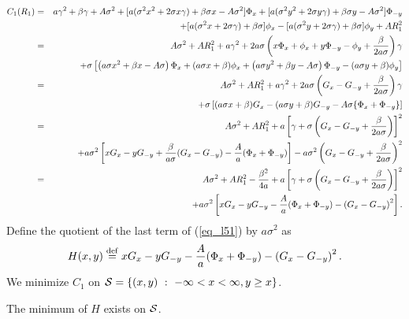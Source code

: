 \begin{eqnarray}
  C_1(R_1)
   & = & a \gamma^2 + \beta \gamma + A \sigma^2 + [a (\sigma^2 x^2 + 2 \sigma x \gamma)
         + \beta \sigma x - A\sigma^2] \Phi_x
         + [a (\sigma^2 y^2 + 2 \sigma y \gamma) + \beta \sigma y - A \sigma^2] \Phi_{-y} \nonumber \\
   &   & + [a (\sigma^2 x + 2\sigma \gamma) + \beta \sigma] \phi_x
       - [a (\sigma^2 y + 2\sigma \gamma) + \beta \sigma] \phi_y + A R_1^2  \nonumber \\
   & = & A \sigma^2 + AR_1^2 + a \gamma^2 + 2 a \sigma \left( x \Phi_x + \phi_x
         + y \Phi_{-y} - \phi_y + \frac{\beta}{2a\sigma}  \right) \gamma \nonumber \\
   &   & + \sigma \left[ \left(
         a \sigma x^2 + \beta x - A \sigma \right) \Phi_x + (a \sigma x + \beta) \phi_x +
         \left( a \sigma y^2 + \beta y -A \sigma \right) \Phi_{-y} - (a \sigma y + \beta) \phi_y
         \right] \nonumber \\
   & = & A\sigma^2 + AR_1^2 + a \gamma^2 + 2 a \sigma \left( G_x - G_{-y}
         + \frac{\beta}{2a\sigma} \right) \gamma \nonumber \\
   &   & + \sigma \left[ (a\sigma x + \beta) G_x - (a\sigma y + \beta) G_{-y}
         - A \sigma \{ \Phi_x + \Phi_{-y} \} \right] \nonumber \\
   & = & A\sigma^2 + AR_1^2 + a \left[ \gamma + \sigma \left( G_x - G_{-y}
         + \frac{\beta}{2a\sigma} \right) \right]^2 \nonumber \\
   &   & + a \sigma^2 \left[ x G_x - y G_{-y} + \frac{\beta}{a\sigma} (G_x - G_{-y}) - \frac{A}{a} (\Phi_x + \Phi_{-y})
         \right] - a \sigma^2 \left( G_x - G_{-y} + \frac{\beta}{2a\sigma} \right)^2 \nonumber \\
   & = & A\sigma^2 + AR_1^2  - \frac{\beta^2}{4a} + a \left[ \gamma
         + \sigma \left( G_x - G_{-y} + \frac{\beta}{2a\sigma} \right) \right]^2 \nonumber \\
   &   & + a \sigma^2 \left[ x G_x - y G_{-y} - \frac{A}{a} ( \Phi_x + \Phi_{-y} )
         - \left( G_x - G_{-y} \right)^2 \right]. \label{eq_l51}
\end{eqnarray}
Define the quotient of the last term of (\ref{eq_l51}) by $a \sigma^2$ as
\[ %
  H(x,y) \define x \gx - y \gmy - \frac{A}{a} ( \Px + \Pmy )
        - \left( \gx - \gmy \right)^2.
\] %
We minimize $C_1$ on ${\cal S} = \{ (x,y)\ : \ -\infty < x <\infty, y \geq x \}$.

\begin{lemma}\label{lem_l1}
  \quad The minimum of $H$ exists on ${\cal S}$.
\end{lemma}

